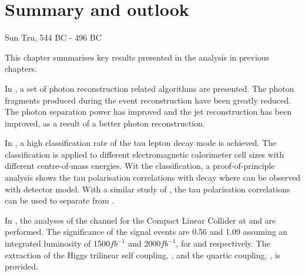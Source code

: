 \chapter{Summary and outlook}
\label{chap:summary}



%
{Sun Tzu, 544 BC - 496 BC}




This chapter summarises key results presented in the analysis in previous chapters.

In , a set of photon reconstruction related algorithms are presented. The photon fragments produced during the event reconstruction have been greatly reduced. The photon separation power has improved and the jet reconstruction has been improved, as a result of a better photon reconstruction.

In , a high classification rate of the tau lepton decay mode is achieved. The classification is applied to different electromagnetic calorimeter cell sizes with different centre-of-mass energies. Wit the classification, a proof-of-principle analysis shows the tau polarisation correlations with \ZToTauTau decay where \tauToPion can be observed with \ILD detector model. With a similar study of \HiggsToTauTau,  the tau polarisation correlations can be used to separate \PHiggs from \PZ.


 In , the analyses of the \eeToHHbbWWFull channel for the Compact Linear Collider at  and  are performed. The significance of the signal events are 0.56 and 1.09 assuming an integrated luminosity of 1500$fb^{-1}$ and 2000$fb^{-1}$, for   and  respectively. The extraction of the Higgs trilinear self coupling, \gHHH, and the quartic coupling, \gWWHH, is provided.

